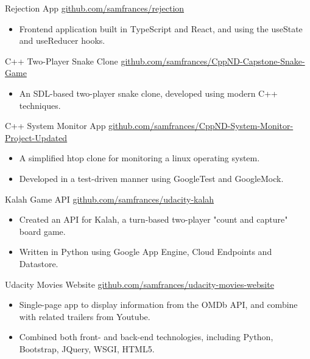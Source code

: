 \documentclass[10pt,a4paper,sans]{moderncv} %
\begin{document}
        { Rejection App}{}{}
        {\href{ https://github.com/samfrances/rejection }{ github.com/samfrances/rejection }}
        {            \begin{itemize}
                \item{Frontend application built in TypeScript and React, and using the useState and useReducer hooks.}
            \end{itemize}
}
        { C++ Two-Player Snake Clone}{}{}
        {\href{ https://github.com/samfrances/CppND-Capstone-Snake-Game }{ github.com/samfrances/CppND-Capstone-Snake-Game }}
        {            \begin{itemize}
                \item{An SDL-based two-player snake clone, developed using modern C++ techniques.}
            \end{itemize}
}
        { C++ System Monitor App}{}{}
        {\href{ https://github.com/samfrances/CppND-System-Monitor-Project-Updated }{ github.com/samfrances/CppND-System-Monitor-Project-Updated }}
        {            \begin{itemize}
                \item{A simplified htop clone for monitoring a linux operating system.}
                \item{Developed in a test-driven manner using GoogleTest and GoogleMock.}
            \end{itemize}
}
        { Kalah Game API}{}{}
        {\href{ http://www.github.com/samfrances/udacity-kalah }{ github.com/samfrances/udacity-kalah }}
        {            \begin{itemize}
                \item{Created an API for Kalah, a turn-based two-player "count and capture" board game.}
                \item{Written in Python using Google App Engine, Cloud Endpoints and Datastore.}
            \end{itemize}
}
        { Udacity Movies Website}{}{}
        {\href{ http://www.github.com/samfrances/udacity-movies-website }{ github.com/samfrances/udacity-movies-website }}
        {            \begin{itemize}
                \item{Single-page app to display information from the OMDb API, and combine with related trailers from Youtube.}
                \item{Combined both front- and back-end technologies, including Python, Bootstrap, JQuery, WSGI, HTML5.}
            \end{itemize}
}
\end{document}
